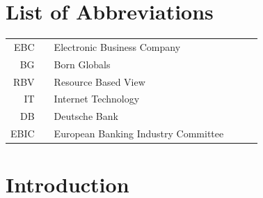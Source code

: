 \documentclass[11pt,a4paper]{article}
\begin{document}
\newpage


\scalebox{0.8}{
\vbox{
 \tableofcontents

}
  }
  
  \newpage 
  \cleardoublepage
\section*{List of Abbreviations}

\begin{tabular}{rp{0.2cm}lp{1cm}p{7cm}l}
    EBC     & &  \small Electronic Business Company   & &      \\
    BG    & &  \small Born Globals   & & \\
            RBV     & &  \small Resource Based View  & & \\
                        IT     & &  \small Internet Technology  & & \\
        DB     & &  \small Deutsche Bank  & & \\
                EBIC     & &  \small European Banking Industry Committee  & & \\
\end{tabular}

  
\newpage

  \cleardoublepage

\listoffigures


\newpage
  \cleardoublepage

\listoftables


\captionsetup{justification=justified,singlelinecheck=false}

\pagebreak
{}
\flushbottom
\doublespacing
\parindent=1cm



\section{Introduction}
\label{intro}
\end{document}
